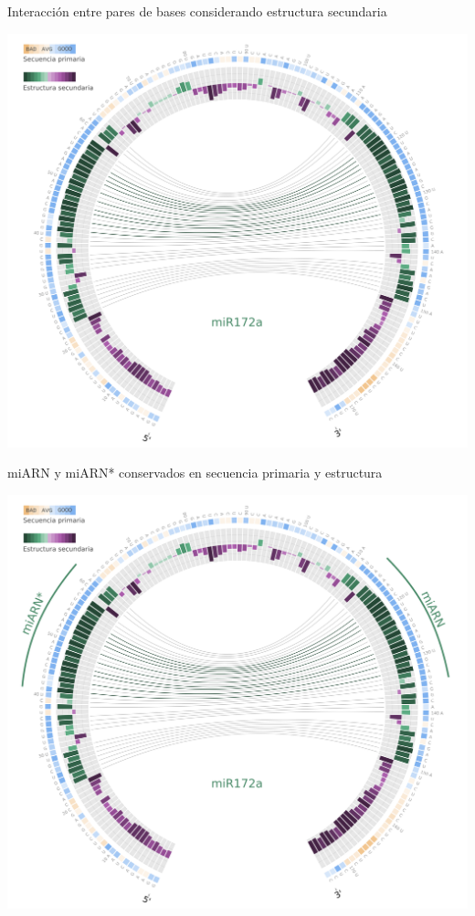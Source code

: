 \documentclass{beamer}
\begin{document}
\begin{frame}{Interacción entre pares de bases considerando estructura secundaria}
	\begin{center}
		\includegraphics[width=.8\textwidth]{img/miR172a_circos03.png}
	\end{center}
\end{frame}

\begin{frame}{miARN y miARN* conservados en secuencia primaria y estructura}
	\begin{center}
		\includegraphics[width=.8\textwidth]{img/miR172a_circos04.png}
	\end{center}
\end{frame}
\end{document}

